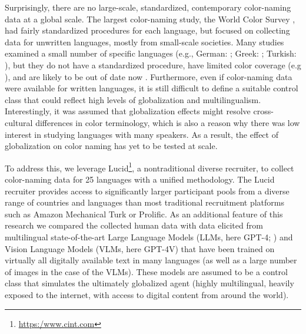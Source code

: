 Surprisingly, there are no large-scale, standardized, contemporary color-naming data at a global scale. The largest color-naming study, the World Color Survey \parencite{kayWorld2016}, had fairly standardized procedures for each language, but focused on collecting data for unwritten languages, mostly from small-scale societies. 
Many studies examined a small number of specific languages (e.g., German: \textcite{zollingerWhy1984}; Greek: \textcite{thierryUnconscious2009}; Turkish: \textcite{ozgenTurkish1998}), but they do not have a standardized procedure, have limited color coverage (e.g \parencite{winawerRussian2007}), and are likely to be out of date now \parencite{al-rasheedFurther2014, berlinBasic1969,kurikiModern2017, ozgenTurkish1998, thierryUnconscious2009, zollingerWhy1984}.
Furthermore, even if color-naming data were available for written languages, it is still difficult to define a suitable control class that could reflect high levels of globalization and multilingualism. Interestingly, it was assumed that globalization effects might resolve cross-cultural differences in color terminology, which is also a reason why there was low interest in studying languages with many speakers.
As a result, the effect of globalization on color naming has yet to be tested at scale. 

To address this, we leverage Lucid\footnote{\url{https:/www.cint.com}}, a nontraditional diverse recruiter, to collect color-naming data for 25 languages with a unified methodology.  The Lucid recruiter provides access to significantly larger participant pools from a diverse range of countries and languages than most traditional recruitment platforms such as Amazon Mechanical Turk or Prolific.  As an additional feature of this research we compared the collected human data with data elicited from multilingual state-of-the-art Large Language Models (LLMs, here GPT-4; \textcite{achiam2023gpt}) and Vision Language Models (VLMs, here GPT-4V) that have been trained on virtually all digitally available text in many languages (as well as a large number of images in the case of the VLMs). These models are assumed to be a control class that simulates the ultimately globalized agent (highly multilingual, heavily exposed to the internet, with access to digital content from around the world).


